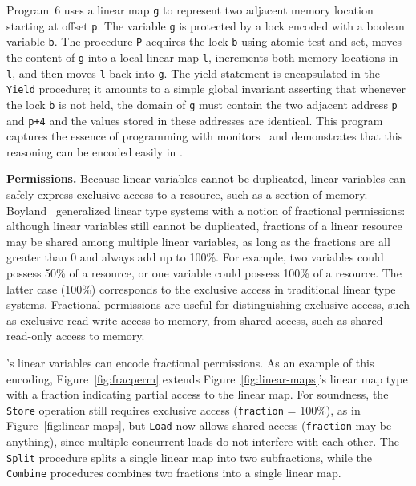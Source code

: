 Program~6 uses a linear map {\tt g} to represent two adjacent memory location starting at offset {\tt p}.
The variable {\tt g} is protected by a lock encoded with a boolean variable {\tt b}.
The procedure {\tt P} acquires the lock {\tt b} using atomic test-and-set, moves the content of {\tt g} into a local 
linear map {\tt l}, increments both memory locations in {\tt l}, and then moves {\tt l} back into {\tt g}.
The yield statement is encapsulated in the {\tt Yield} procedure; 
it amounts to a simple global invariant asserting that whenever the lock {\tt b} is not held, the domain of {\tt g} must
contain the two adjacent address {\tt p} and {\tt p+4} and the values stored in these addresses are identical.
This program captures the essence of programming with monitors~\cite{Hoare74} and demonstrates that this reasoning 
can be encoded easily in \civl.

{\bf Permissions.}
Because linear variables cannot be duplicated,
linear variables can safely express exclusive access to a resource, such as a section of memory.
Boyland~\cite{boyland:03fractions} generalized linear type systems with a notion of fractional permissions:
although linear variables still cannot be duplicated,
fractions of a linear resource may be shared among multiple linear variables,
as long as the fractions are all greater than 0 and always add up to 100\%.
For example, two variables could possess 50\% of a resource,
or one variable could possess 100\% of a resource.
The latter case (100\%) corresponds to the exclusive access in traditional linear type systems.
Fractional permissions are useful for distinguishing exclusive access,
such as exclusive read-write access to memory,
from shared access, such as shared read-only access to memory.

\civl's linear variables can encode fractional permissions.
As an example of this encoding,
Figure~\ref{fig:fracperm} extends Figure~\ref{fig:linear-maps}'s linear map type
with a fraction indicating partial access to the linear map.
For soundness, the {\tt Store} operation still requires exclusive access ({\tt fraction} = 100\%),
as in Figure~\ref{fig:linear-maps},
but {\tt Load} now allows shared access ({\tt fraction} may be anything),
since multiple concurrent loads do not interfere with each other.
The {\tt Split} procedure splits a single linear map into two subfractions,
while the {\tt Combine} procedures combines two fractions into a single linear map.

